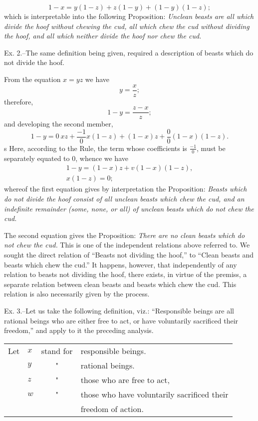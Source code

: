 \documentclass[oneside]{book}
\begin{document}
\[
     1-x = y(1-z)+z(1-y)+(1-y)(1-z);
\]
which is interpretable into the following Proposition: \textit{Unclean
beasts are all which divide the hoof without chewing the cud, all
which chew the cud without dividing the hoof, and all which neither
divide the hoof nor chew the cud.}

Ex. 2.--The same definition being given, required a description
of beasts which do not divide the hoof.

From the equation $x = yz$ we have
\[
     y = \frac{x}{z};
\]
therefore,
\[
     1-y = \frac{z-x}{z};
\]
and developing the second member,
\[
     1-y = 0\:xz+\frac{-1}{0}x(1-z)+(1-x)z+\frac{0}{0}(1-x)(1-z).
\]s
Here, according to the Rule, the term whose coefficients is $\frac{-1}{0}$,
must be separately equated to $0$, whence we have
\begin{eqnarray*}
     1-y = (1-x)z+v(1-x)(1-z),\\
     x(1-z)=0;
\end{eqnarray*}
whereof the first equation gives by interpretation the Proposition:
\textit{Beasts which do not divide the hoof consist of all unclean beasts which
chew the cud, and an indefinite remainder (some, none, or all) of unclean
beasts which do not chew the cud.}

The second equation gives the Proposition: \textit{There are no clean
beasts which do not chew the cud.} This is one of the independent
relations above referred to. We sought the direct relation of
``Beasts not dividing the hoof,'' to ``Clean beasts and beasts
which chew the cud.'' It happens, however, that independently
of any relation to beasts not dividing the hoof, there exists, in
virtue of the premiss, a separate relation between clean beasts
and beasts which chew the cud. This relation is also necessarily
given by the process.

Ex. 3.--Let us take the following definition, viz.: ``Responsible
beings are all rational beings who are either free to act, or
have voluntarily sacrificed their freedom,'' and apply to it the
preceding analysis.

\begin{tabular}{c l c l}
Let &$x$ &stand for &responsible beings.\\
    &$y$     &"     &rational beings. \\
    &$z$     &"     &those who are free to act,\\
    &$w$     &"     &those who have voluntarily sacrificed their \\
    &        &      &freedom of action.
\end{tabular}\\
\end{document}

